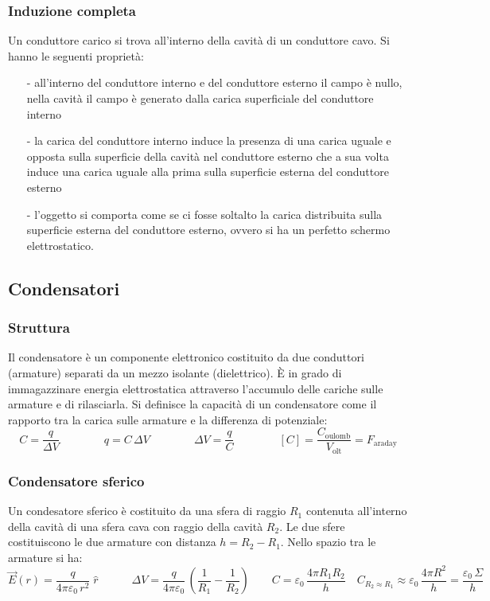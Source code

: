 \documentclass[a4paper]{article}
\begin{document}
\subsubsection*{Induzione completa}
Un conduttore carico si trova all'interno della cavità di un conduttore cavo. Si hanno le seguenti proprietà:
\begin{itemize}[topsep=3pt, itemsep=0pt]
	\item[-] all'interno del conduttore interno e del conduttore esterno il campo è nullo, nella cavità il campo è generato dalla
	carica superficiale del conduttore interno
	\item[-] la carica del conduttore interno induce la presenza di una carica uguale e opposta sulla superficie della cavità nel
	conduttore esterno che a sua volta induce una carica uguale alla prima sulla superficie esterna del conduttore esterno
	\item[-] l'oggetto si comporta come se ci fosse soltalto la carica distribuita sulla superficie esterna del conduttore esterno,
	ovvero si ha un perfetto schermo elettrostatico.
\end{itemize}

\newpage

\subsection{Condensatori}
\subsubsection*{Struttura}
Il condensatore è un componente elettronico costituito da due conduttori (armature) separati da un mezzo isolante (dielettrico).
È in grado di immagazzinare energia elettrostatica attraverso l'accumulo delle cariche sulle armature e di rilasciarla. Si
definisce la capacità di un condensatore come il rapporto tra la carica sulle armature e la differenza di potenziale:
\[C = \frac{q}{\Delta V} \qquad \qquad q = C \, \Delta V \qquad \qquad \Delta V = \frac{q}{C} \qquad \qquad [C] = \frac{C_\text{oulomb}}{V_\text{olt}} = F_\text{araday}\]

\subsubsection*{Condensatore sferico}
Un condesatore sferico è costituito da una sfera di raggio \(R_1\) contenuta all'interno della cavità di una sfera cava con raggio
della cavità \(R_2\). Le due sfere costituiscono le due armature con distanza \(h = R_2 - R_1\). Nello spazio tra le armature si ha:
\[\vec{E}(r) = \frac{q}{4 \pi \varepsilon_0 \, r^2} \; \hat{r} \qquad \quad \Delta V = \frac{q}{4 \pi \varepsilon_0} \, \left(\frac{1}{R_1} - \frac{1}{R_2}\right) \qquad C = \varepsilon_0 \, \frac{4 \pi R_1 R_2}{h} \quad C_{R_2 \approx R_1} \approx \varepsilon_0 \, \frac{4 \pi R^2}{h} = \frac{\varepsilon_0 \, \Sigma}{h}\]
\end{document}

